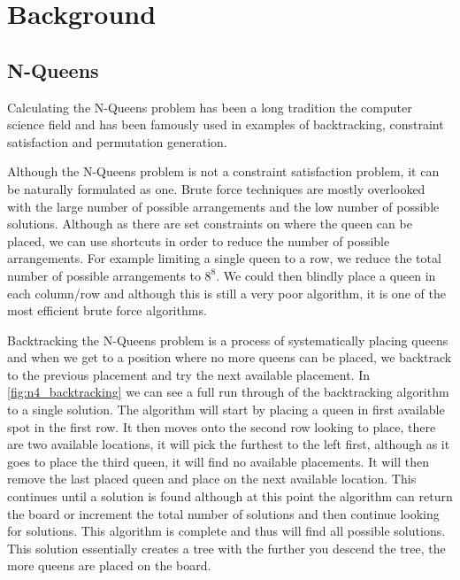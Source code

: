 \chapter{Background}\label{chap:background}
\section{N-Queens}\label{sec:background_nqueens} 
Calculating the N-Queens problem has been a long tradition the computer science field and has been famously used in examples of backtracking\cite{golomb}, constraint satisfaction\cite{nadel1989constraint} and permutation generation\cite{swarm}.
		
Although the N-Queens problem is not a constraint satisfaction problem, it can be naturally formulated as one\cite{nadel1990representation}. Brute force techniques are mostly overlooked with the large number of possible arrangements and the low number of possible solutions. Although as there are set constraints on where the queen can be placed, we can use shortcuts in order to reduce the number of possible arrangements. For example limiting a single queen to a row, we reduce the total number of possible arrangements to \(8^8\). We could then blindly place a queen in each column/row and although this is still a very poor algorithm, it is one of the most efficient brute force algorithms. 
		

		

Backtracking the N-Queens problem is a process of systematically placing queens and when we get to a position where no more queens can be placed, we backtrack to the previous placement and try the next available placement. In \ref{fig:n4_backtracking} we can see a full run through of the backtracking algorithm to a single solution. The algorithm will start by placing a queen in first available spot in the first row. It then moves onto the second row looking to place, there are two available locations, it will pick the furthest to the left first, although as it goes to place the third queen, it will find no available placements. It will then remove the last placed queen and place on the next available location. This continues until a solution is found although at this point the algorithm can return the board or increment the total number of solutions and then continue looking for solutions. This algorithm is complete and thus will find all possible solutions. This solution essentially creates a tree with the further you descend the tree, the more queens are placed on the board. 
		
